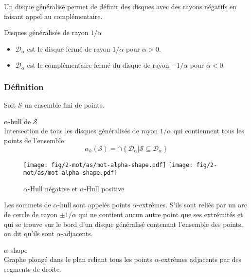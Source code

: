 Un disque généralisé permet de définir des disques avec des rayons négatifs en faisant appel au complémentaire.

\begin{Definition}{Disques généralisés de rayon $1/\alpha$}
\label{def:dis-gen}
\begin{itemize}
  \item $\mathcal{D}_{\alpha}$ est le disque fermé de rayon $1/\alpha$ pour $\alpha > 0$.
  \item $\mathcal{D}_{\alpha}$ est le complémentaire fermé du disque de rayon $- 1/\alpha$ pour $\alpha < 0$. 
\end{itemize}
\end{Definition}

\subsubsection{Définition}

Soit $\mathcal{S}$ un ensemble fini de points. 

\begin{Definition}{$\alpha$-hull de $\mathcal{S}$}\\
\label{def:ah-txt}
    Intersection de tous les disques généralisés de rayon $1/\alpha$ qui contiennent tous les points de l'ensemble.
    $$ \alpha_h(\mathcal{S}) = \cap \left\{ \mathcal{D}_{\alpha} | \mathcal{S} \subseteq \mathcal{D}_{\alpha} \right\}$$
\end{Definition}

\begin{figure}[H]
  \centering
  \texttt{[image: fig/2-mot/as/mot-alpha-shape.pdf]}
  \texttt{[image: fig/2-mot/as/mot-alpha-shape.pdf]}
  \caption{$\alpha$-Hull négative et $\alpha$-Hull positive }
\end{figure}
  
Les sommets de $\alpha$-hull sont appelés points $\alpha$-extrêmes. S'ils sont reliés par un arc de cercle de rayon $\pm 1/ \alpha$ qui ne contient aucun autre point que ses extrémités et qui se trouve sur le bord d'un disque généralisé contenant l'ensemble des points, on dit qu'ils sont $\alpha$-adjacents.

\begin{Definition}{$\alpha$-shape}\\
\label{def:as}
      Graphe plongé dans le plan reliant tous les points $\alpha$-extrêmes adjacents par des segments de droite.
\end{Definition}

